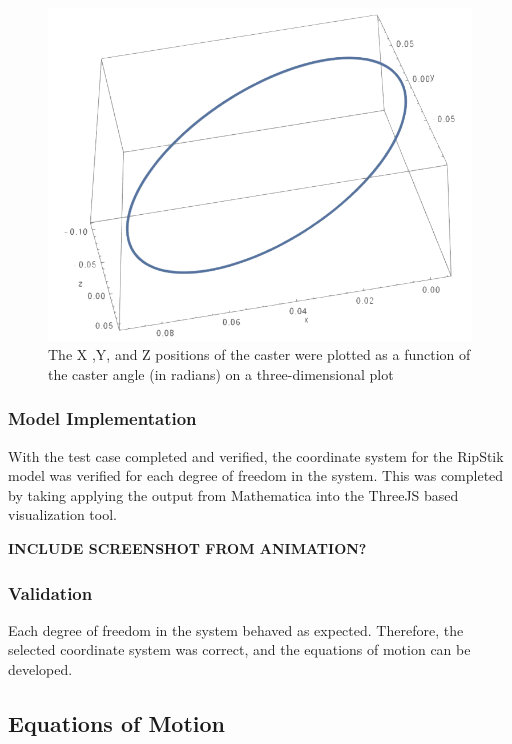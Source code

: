\begin{figure}[!htb]
	\centering
	\includegraphics[width=\linewidth]{CasterWheel3DTest.png}
	\caption{The X ,Y, and Z positions of the caster were plotted as a function of the caster angle (in radians) on a three-dimensional plot}\label{fig:CasterWheel3DTest}
	\endminipage
\end{figure} 

\subsubsection{Model Implementation}

With the test case completed and verified, the coordinate system for the RipStik model was verified for each degree of freedom in the system. 
This was completed by taking applying the output from Mathematica into the ThreeJS based visualization tool.

\textbf{INCLUDE SCREENSHOT FROM ANIMATION?}
\subsubsection{Validation}

Each degree of freedom in the system behaved as expected. 
Therefore, the selected coordinate system was correct, and the equations of motion can be developed.

\subsection{Equations of Motion}

